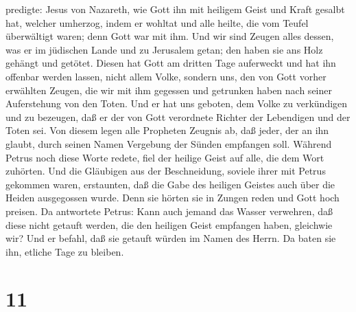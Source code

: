 predigte:  Jesus von Nazareth, wie Gott ihn mit heiligem
Geist und Kraft gesalbt hat, welcher umherzog, indem er wohltat und alle
heilte, die vom Teufel überwältigt waren; denn Gott war mit ihm.
 Und wir sind Zeugen alles dessen, was er im jüdischen
Lande und zu Jerusalem getan; den haben sie ans Holz gehängt und
getötet.  Diesen hat Gott am dritten Tage auferweckt und
hat ihn offenbar werden lassen,  nicht allem Volke,
sondern uns, den von Gott vorher erwählten Zeugen, die wir mit ihm
gegessen und getrunken haben nach seiner Auferstehung von den Toten.
 Und er hat uns geboten, dem Volke zu verkündigen und zu
bezeugen, daß er der von Gott verordnete Richter der Lebendigen und der
Toten sei.  Von diesem legen alle Propheten Zeugnis ab,
daß jeder, der an ihn glaubt, durch seinen Namen Vergebung der Sünden
empfangen soll.  Während Petrus noch diese Worte redete,
fiel der heilige Geist auf alle, die dem Wort zuhörten. 
Und die Gläubigen aus der Beschneidung, soviele ihrer mit Petrus
gekommen waren, erstaunten, daß die Gabe des heiligen Geistes auch über
die Heiden ausgegossen wurde.  Denn sie hörten sie in
Zungen reden und Gott hoch preisen. Da antwortete Petrus:
 Kann auch jemand das Wasser verwehren, daß diese nicht
getauft werden, die den heiligen Geist empfangen haben, gleichwie wir?
 Und er befahl, daß sie getauft würden im Namen des
Herrn. Da baten sie ihn, etliche Tage zu bleiben.

\hypertarget{section-10}{%
\section{11}\label{section-10}}

